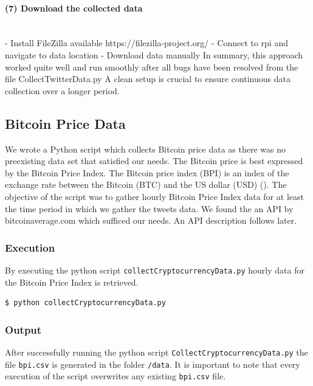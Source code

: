 \documentclass[a4paper,12pt]{article}
\begin{document}
\begin{spacing}{1.2}
\paragraph{(7) Download the collected data}\mbox{}\\
- Install FileZilla available https://filezilla-project.org/ \newline
- Connect to rpi and navigate to data location \newline
- Download data manually \newline \newline In summary, this approach worked quite well and run smoothly after all bugs have been resolved from the file CollectTwitterData.py A clean setup is crucial to ensure continuous data collection over a longer period.

\subsection{Bitcoin Price Data}
We wrote a Python script which collects Bitcoin price data as there was no preexisting data set that satisfied our needs. The Bitcoin price is best expressed by the Bitcoin Price Index. The Bitcoin price index (BPI) is an index of the exchange rate between the Bitcoin (BTC) and the US dollar (USD) (\cite{kristoufek2015main}). The objective of the script was to gather hourly Bitcoin Price Index data for at least the time period in which we gather the tweets data. We found the an API by bitcoinaverage.com which sufficed our needs. An API description follows later.

\subsubsection{Execution}
By executing the python script \verb|collectCryptocurrencyData.py| hourly data for the Bitcoin Price Index is retrieved.
\begin{lstlisting}[language=bash]
    $ python collectCryptocurrencyData.py
\end{lstlisting}

\subsubsection{Output}
After successfully running the python script \verb|CollectCryptocurrencyData.py| the file \verb|bpi.csv| is generated in the folder \verb|/data|. It is important to note that every execution of the script overwrites any existing \verb|bpi.csv| file.


\end{spacing}
\end{document}
